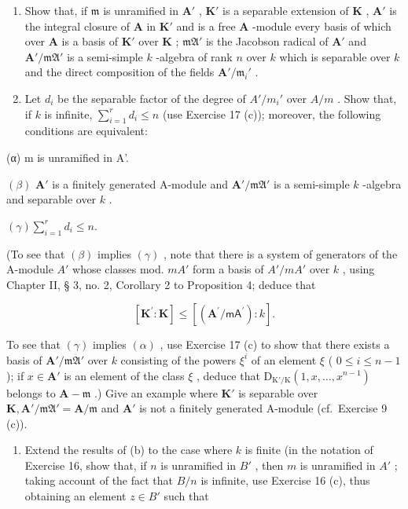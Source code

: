 \begin{enumerate}
\def\labelenumi{(\alph{enumi})}
\item
  Show that, if \(\mathfrak{m}\) is unramified in \(\mathbf{A}'\) , \(\mathbf{K}'\) is a separable extension of \(\mathbf{K}\) , \(\mathbf{A}'\) is the integral closure of \(\mathbf{A}\) in \(\mathbf{K}'\) and is a free \(\mathbf{A}\) -module every basis of which over \(\mathbf{A}\) is a basis of \(\mathbf{K}'\) over \(\mathbf{K}\) ; \(\mathfrak{mA}'\) is the Jacobson radical of \(\mathbf{A}'\) and \(\mathbf{A}' / \mathfrak{mA}'\) is a semi-simple \(k\) -algebra of rank \(n\) over \(k\) which is separable over \(k\) and the direct composition of the fields \(\mathbf{A}' / \mathfrak{m}_i'\) .
\item
  Let \(d_{i}\) be the separable factor of the degree of \(A'/m_{i}'\) over \(A/m\) . Show that, if \(k\) is infinite, \(\sum_{i=1}^{r} d_{i} \leqslant n\) (use Exercise 17 (c)); moreover, the following conditions are equivalent:
\end{enumerate}

(α) m is unramified in A'.

\((\beta)\) \(\mathbf{A}'\) is a finitely generated A-module and \(\mathbf{A}' / \mathfrak{mA}'\) is a semi-simple \(k\) -algebra and separable over \(k\) .

\((\gamma)\sum_{i=1}^{r}d_{i}\leqslant n.\)

(To see that \((\beta)\) implies \((\gamma)\) , note that there is a system of generators of the A-module \(A'\) whose classes mod. \(mA'\) form a basis of \(A'/mA'\) over \(k\) , using Chapter II, § 3, no. 2, Corollary 2 to Proposition 4; deduce that

\[
[ \mathbf {K} ^ {\prime}: \mathbf {K} ] \leqslant [ (\mathbf {A} ^ {\prime} / \mathsf {m A} ^ {\prime}): k ].
\]

To see that \((\gamma)\) implies \((\alpha)\) , use Exercise 17 (c) to show that there exists a basis of \(\mathbf{A}' / \mathfrak{mA}'\) over \(k\) consisting of the powers \(\xi^i\) of an element \(\xi\) ( \(0 \leqslant i \leqslant n - 1\) ); if \(x \in \mathbf{A}'\) is an element of the class \(\xi\) , deduce that \(\mathrm{D}_{\mathrm{K}' / \mathrm{K}}(1, x, \ldots, x^{n-1})\) belongs to \(\mathbf{A} - \mathfrak{m}\) .) Give an example where \(\mathbf{K}'\) is separable over \(\mathbf{K}, \mathbf{A}' / \mathfrak{mA}' = \mathbf{A} / \mathfrak{m}\) and \(\mathbf{A}'\) is not a finitely generated A-module (cf.~Exercise 9 (c)).

\begin{enumerate}
\def\labelenumi{(\alph{enumi})}
\setcounter{enumi}{2}
\tightlist
\item
  Extend the results of (b) to the case where \(k\) is finite (in the notation of Exercise 16, show that, if \(n\) is unramified in \(B'\) , then \(m\) is unramified in \(A'\) ; taking account of the fact that \(B / n\) is infinite, use Exercise 16 (c), thus obtaining an element \(z \in B'\) such that
\end{enumerate}

